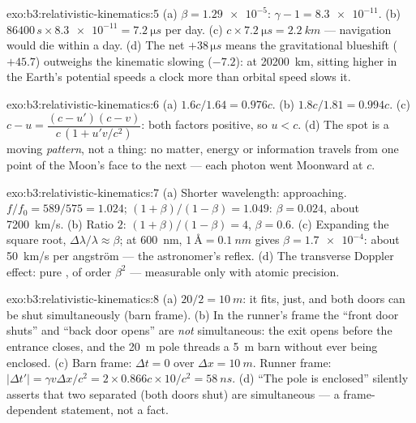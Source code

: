 \begin{solution}{exo:b3:relativistic-kinematics:5}
(a) $\beta = \num{1.29e-5}$: $\gamma - 1 = \num{8.3e-11}$. (b)
$86400\,\unit{s} \times \num{8.3e-11} = \qty{7.2}{\micro s}$ per day.
(c) $c \times \qty{7.2}{\micro s} = \qty{2.2}{km}$ --- navigation
would die within a day. (d) The net $+38\,\unit{\micro s}$ means the
gravitational blueshift ($+45.7$) outweighs the kinematic slowing
($-7.2$): at \qty{20200}{km}, sitting higher in the Earth's potential
speeds a clock more than orbital speed slows it.
\end{solution}

\begin{solution}{exo:b3:relativistic-kinematics:6}
(a) $1.6c/1.64 = 0.976c$. (b) $1.8c/1.81 = 0.994c$. (c) $c - u =
\dfrac{(c - u')(c - v)}{c\,(1 + u'v/c^2)}$: both factors positive, so
$u < c$. (d) The spot is a moving \emph{pattern}, not a thing: no
matter, energy or information travels from one point of the Moon's
face to the next --- each photon went Moonward at $c$.
\end{solution}

\begin{solution}{exo:b3:relativistic-kinematics:7}
(a) Shorter wavelength: approaching. $f/f_0 = 589/575 = 1.024$;
$(1+\beta)/(1-\beta) = 1.049$: $\beta = 0.024$, about
\qty{7200}{km/s}. (b) Ratio $2$: $(1+\beta)/(1-\beta) = 4$, $\beta =
0.6$. (c) Expanding the square root, $\Delta\lambda/\lambda \approx
\beta$; at \qty{600}{nm}, $\qty{1}{\angstrom} = \qty{0.1}{nm}$ gives
$\beta = \num{1.7e-4}$: about \qty{50}{km/s} per angström --- the
astronomer's reflex. (d) The transverse Doppler effect: pure , of order $\beta^2$ --- measurable only with atomic
precision.
\end{solution}

\begin{solution}{exo:b3:relativistic-kinematics:8}
(a) $20/2 = \qty{10}{m}$: it fits, just, and both doors can be shut
simultaneously (barn frame). (b) In the runner's frame the 
``front door shuts'' and ``back door opens'' are \emph{not}
simultaneous: the exit opens before the entrance closes, and the
\qty{20}{m} pole threads a \qty{5}{m} barn without ever being
enclosed. (c) Barn frame: $\Delta t = 0$ over $\Delta x =
\qty{10}{m}$. Runner frame: $|\Delta t'| = \gamma v\Delta x/c^2 =
2 \times 0.866c \times 10/c^2 = \qty{58}{ns}$. (d) ``The pole is
enclosed'' silently asserts that two separated  (both doors
shut) are simultaneous --- a frame-dependent statement, not a fact.
\end{solution}


